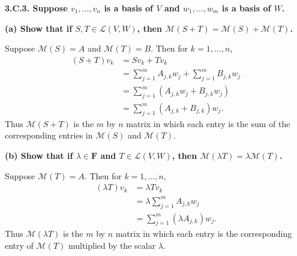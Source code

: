 \documentclass[a5paper]{article}
\begin{document}
\newcommand   \C           {\mathbf{C}}
\newcommand   \R           {\mathbf{R}}
\renewcommand \L           {\mathcal{L}}
\newcommand   \F           {\mathbf{F}}
\renewcommand \P           {\mathcal{P}}
\newcommand   \M           {\mathcal{M}}
\newcommand   \question[1] {\textbf{\boldmath#1\unboldmath}\par}
\newcommand   \op          {\operatorname}

\question{
    3.C.3. Suppose $v_1,\dots,v_n$ is a basis of $V$ and $w_1,\dots,w_m$ is a basis of $W$.
}
\question{
    (a) Show that if $S,T \in \L(V,W)$, then $\M(S+T) = \M(S)+\M(T)$.
}

    Suppose $\M(S) = A$ and $\M(T) = B$.
    Then for $k = 1,\dots,n$,
\begin{align*}
        (S+T)v_k &= Sv_k + Tv_k \\
                 &= \sum_{j=1}^m A_{j,k}w_j + \sum_{j=1}^m B_{j,k}w_j \\
                 &= \sum_{j=1}^m (A_{j,k}w_j + B_{j,k}w_j) \\
                 &= \sum_{j=1}^m (A_{j,k} + B_{j,k}) w_j .
\end{align*}
    Thus $\M(S + T)$ is the $m$ by $n$ matrix in which each entry is the sum of the corresponding entries in $\M(S)$ and $\M(T)$.

\question{
    (b) Show that if $\lambda \in \F$ and $T \in \L(V,W)$, then $\M(\lambda T) = \lambda\M(T)$.
}

    Suppose $\M(T) = A$.
    Then for $k = 1,\dots,n$,
\begin{align*}
        (\lambda T)v_k &= \lambda Tv_k \\
                     &= \lambda \sum_{j=1}^m A_{j,k}w_j \\
                     &= \sum_{j=1}^m (\lambda A_{j,k})w_j .
\end{align*}
    Thus $\M(\lambda T)$ is the $m$ by $n$ matrix in which each entry is the corresponding entry of $\M(T)$ multiplied by the scalar $\lambda$.
\end{document}
